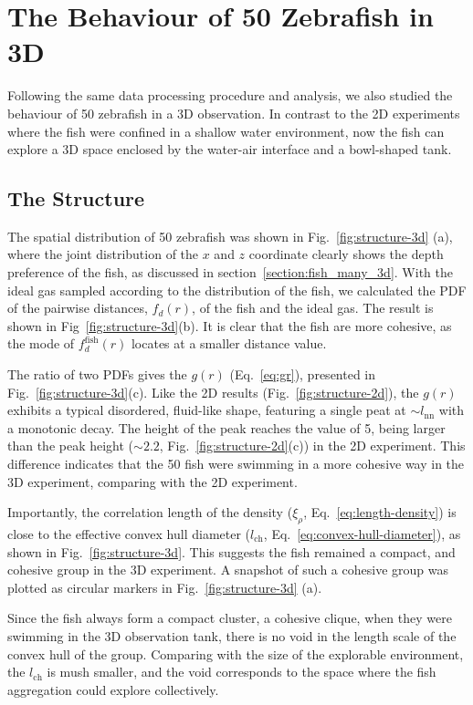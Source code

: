 \documentclass[11pt,twoside]{report}
\begin{document}
\section{The Behaviour of 50 Zebrafish in 3D}

Following the same data processing procedure and analysis, we also studied the behaviour of 50 zebrafish in a 3D observation. In contrast to the 2D experiments where the fish were confined in a shallow water environment, now the fish can explore a 3D space enclosed by the water-air interface and a bowl-shaped tank.

\subsection{The Structure}
\label{section:analysis-structure-3d}


The spatial distribution of 50 zebrafish was shown in Fig.~\ref{fig:structure-3d} (a), where the joint distribution of the $x$ and $z$ coordinate clearly shows the depth preference of the fish, as discussed in section~\ref{section:fish_many_3d}. With the ideal gas sampled according to the distribution of the fish, we calculated the PDF of the pairwise distances, $f_d(r)$, of the fish and the ideal gas. The result is shown in Fig~\ref{fig:structure-3d}(b). It is clear that the fish are more cohesive, as the mode of $f_d^\mathrm{fish}(r)$ locates at a smaller distance value.

The ratio of two PDFs gives the $g(r)$ (Eq.~\ref{eq:gr}), presented in Fig.~\ref{fig:structure-3d}(c). Like the 2D results (Fig.~\ref{fig:structure-2d}), the $g(r)$ exhibits a typical disordered, fluid-like shape, featuring a single peat at $\sim l_\mathrm{nn}$ with a monotonic decay. The height of the peak reaches the value of 5, being larger than the peak height ($\sim 2.2$, Fig.~\ref{fig:structure-2d}(c)) in the 2D experiment. This difference indicates that the 50 fish were swimming in a more cohesive way in the 3D experiment, comparing with the 2D experiment.


Importantly, the correlation length of the density ($\xi_\rho$, Eq.~\ref{eq:length-density}) is close to the effective convex hull diameter ($l_\mathrm{ch}$, Eq.~\ref{eq:convex-hull-diameter}), as shown in Fig.~\ref{fig:structure-3d}. This suggests the fish remained a compact, and cohesive group in the 3D experiment. A snapshot of such a cohesive group was plotted as circular markers in Fig.~\ref{fig:structure-3d} (a).

Since the fish always form a compact cluster, a cohesive clique, when they were swimming in the 3D observation tank, there is no void in the length scale of the convex hull of the group. Comparing with the size of the explorable environment, the $l_\mathrm{ch}$ is mush smaller, and the void corresponds to the space where the fish aggregation could explore collectively.
\end{document}
